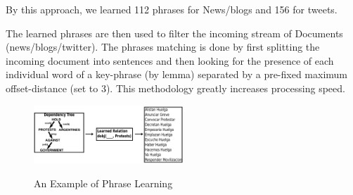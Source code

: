 By this approach, we learned 112 phrases for News/blogs and 156 for tweets.

The learned phrases are then used to filter the incoming stream of Documents (news/blogs/twitter). The phrases matching is done by first splitting the incoming document into sentences and then looking for the presence of each individual word of a key-phrase (by lemma) separated by a pre-fixed maximum offset-distance (set to 3). This methodology greatly increases processing speed.

\begin{figure}
\caption{An Example of Phrase Learning}
\includegraphics[width=0.5\textwidth]{figures/phraseLearning}
\label{fig:phraseLearning}
\end{figure}

